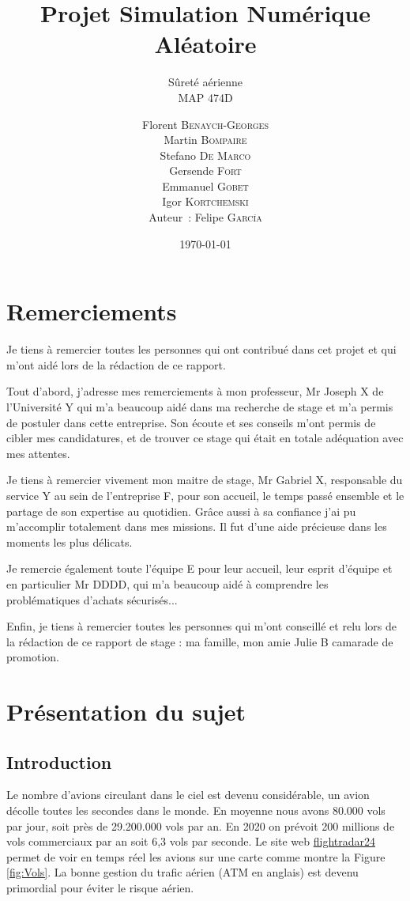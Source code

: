 \documentclass[a4paper, 12pt,twoside]{article}
\title{Projet Simulation Numérique Aléatoire}
\subtitle{Sûreté aérienne \\ MAP 474D}
\author{Florent  \textsc{Benaych-Georges} \\
		Martin \textsc{Bompaire} \\
		Stefano \textsc{De Marco} \\
		Gersende \textsc{Fort} \\
		Emmanuel \textsc{Gobet} \\
		Igor \textsc{Kortchemski} \\
		\vspace{2ex}
		Auteur~: Felipe \textsc{García} \\
		}
\date\today
\numberwithin{equation}{subsection}
\begin{document}
    \maketitle
    \renewcommand{\baselinestretch}{1.1}
    \setlength{\parskip}{0.5em}
    \tableofcontents
    \clearpage
	
	\section{Remerciements} %
	\label{sec:remerciements}
	Je tiens à remercier toutes les personnes qui ont contribué dans cet projet et qui m'ont aidé lors de la rédaction de ce rapport.

	Tout d'abord, j'adresse mes remerciements à mon professeur, Mr Joseph X de l'Université Y qui m'a beaucoup aidé dans ma recherche de stage et m'a permis de postuler dans cette entreprise. Son écoute et ses conseils m'ont permis de cibler mes candidatures, et de trouver ce stage qui était en totale adéquation avec mes attentes.

	Je tiens à remercier vivement mon maitre de stage, Mr Gabriel X, responsable du service Y au sein de l'entreprise F, pour son accueil, le temps passé ensemble et le partage de son expertise au quotidien. Grâce aussi à sa confiance j'ai pu m'accomplir totalement dans mes missions. Il fut d'une aide précieuse dans les moments les plus délicats.

	Je remercie également toute l'équipe E pour leur accueil, leur esprit d'équipe et en particulier Mr DDDD, qui m'a beaucoup aidé à comprendre les problématiques d'achats sécurisés...

	Enfin, je tiens à remercier toutes les personnes qui m'ont conseillé et relu lors de la rédaction de ce rapport de stage : ma famille, mon amie Julie B camarade de promotion.
	\clearpage
	
    \section{Présentation du sujet} %
    \label{sec:presentation_du_sujet}
	
	\subsection{Introduction} %
	\label{sub:introduction}
	
	Le nombre d'avions circulant dans le ciel est devenu considérable, un avion décolle toutes les secondes dans le monde. En moyenne nous avons 80.000 vols par jour, soit près de 29.200.000 vols par an. En 2020 on prévoit 200 millions de vols commerciaux par an soit 6,3 vols par seconde. Le site web \href{https://www.flightradar24.com}{flightradar24} permet de voir en temps réel les avions sur une carte comme montre la Figure \ref{fig:Vols}. La bonne gestion du trafic aérien (ATM en anglais) est devenu primordial pour éviter le risque aérien.
	
\end{document}
